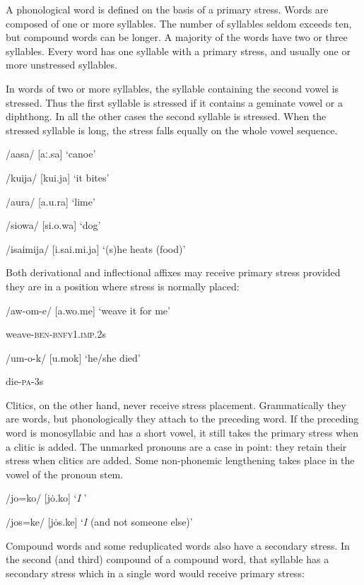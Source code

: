 A phonological word is defined on the basis of a primary stress. Words are composed of one or more syllables. The number of syllables seldom exceeds ten, but compound words can be longer. A majority of the words have two or three syllables.  Every word has one syllable with a primary stress, and usually one or more unstressed syllables. 

In words of two or more syllables, the syllable containing the second vowel is stressed. Thus the first syllable is stressed if it contains a geminate vowel or a diphthong. In all the other cases the second syllable is stressed. When the stressed syllable is long, the stress falls equally on the whole vowel sequence. 

/aasa/  [{{\textprimstress}aː.sa}]  `canoe'

/kuija/  [{{\textprimstress}kui.ja}]  `it bites'

/a{\textphi}ura/  [a.{{\textprimstress}}{\textphi}u.ra]  `lime'

/siowa/  [si.{{\textprimstress}o.wa}]  `dog'

/isaimija/  [i.{{\textprimstress}sai.mi.ja}]  `(s)he heats (food)'

Both derivational and inflectional affixes may receive primary stress provided they are in a position where stress is normally placed:

/aw-om-e/  [a.{{\textprimstress}wo.me}]  `weave it for me'

weave-\textsc{ben}-\textsc{bnfy1}.\textsc{imp}.2s

/um-o-k/  [u.{{\textprimstress}mok}]  `he/she died'

die-\textsc{pa}-3s

Clitics, on the other hand, never receive stress placement. Grammatically they are words, but phonologically they attach to the preceding word. If the preceding word is monosyllabic and has a short vowel, it still takes the primary stress when a clitic is added. The unmarked pronouns are a case in point: they retain their stress when clitics are added. Some non-phonemic lengthening takes place in the vowel of the pronoun stem.

/jo=ko/  [{{\textprimstress}}jo{\.{}.ko}]  `\textit{I} '

/jos=ke/  [{{\textprimstress}}jo{\.{}s.ke}]  `\textit{I} (and not someone else)' 

Compound words and some reduplicated words also have a secondary stress.  In the second (and third) compound of a compound word, that syllable has a secondary stress which in a single word would receive primary stress: 

